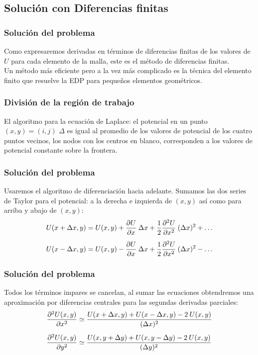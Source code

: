 \subsection{Solución con Diferencias finitas}
\begin{frame}
\frametitle{Solución del problema}
Como expresaremos derivadas en términos de diferencias finitas de los valores de $U$ para cada elemento de la malla, este es el método de diferencias finitas.
\\
\bigskip
Un método más eficiente pero a la vez más complicado es la técnica del elemento finito que resuelve la EDP para pequeños elementos geométricos.
\end{frame}
\begin{frame}
\frametitle{División de la región de trabajo}
El algoritmo para la ecuación de Laplace: el potencial en un punto $(x,y) = (i,j)$ $\Delta$ es igual al promedio de los valores de potencial de los cuatro puntos vecinos, los nodos con los centros en blanco, corresponden a los valores de potencial constante sobre la frontera.
\end{frame}
{
\begin{frame}[plain]
\begin{figure}
	\centering
	
\end{figure}
\end{frame}
}
\begin{frame}
\frametitle{Solución del problema}
Usaremos el algoritmo de diferenciación hacia adelante. Sumamos las dos series de Taylor para el potencial: a la derecha e izquierda de $(x,y)$ así como para arriba y abajo de $(x,y)$:
\fontsize{12}{12}\selectfont
\begin{align*}
U(x + \Delta x, y) &= U(x, y) + \pdv{U}{x} \: \Delta x + \dfrac{1}{2} \pdv[2]{U}{x} \: (\Delta x)^{2} + \ldots \\[0.5em]
U(x - \Delta x, y) &= U(x, y) - \pdv{U}{x} \: \Delta x + \dfrac{1}{2} \pdv[2]{U}{x} \: (\Delta x)^{2} - \ldots \\
\end{align*}
\end{frame}
\begin{frame}
\frametitle{Solución del problema}
Todos los términos impares se cancelan, al sumar las ecuaciones obtendremos una aproximación por diferencias centrales para las segundas derivadas parciales:
\fontsize{12}{12}\selectfont
\begin{align*}
\pdv[2]{U(x,y)}{x} &\simeq \dfrac{U(x + \Delta x, y) + U(x - \Delta x, y) - 2 \: U(x, y)}{(\Delta x)^{2}} \\[0.5em]
\pdv[2]{U(x,y)}{y} &\simeq \dfrac{U(x, y + \Delta y) + U(x, y - \Delta y)-2 \: U(x, y)}{(\Delta y)^{2}}
\end{align*}
\end{frame}
